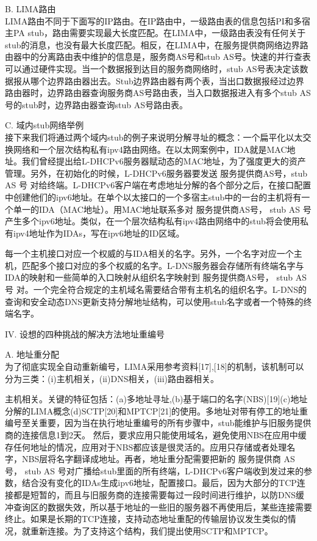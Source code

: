 B.	LIMA路由\\
LIMA路由不同于下面写的IP路由。在IP路由中，一级路由表的信息包括PI和多宿主PA stub，路由需要实现最大长度匹配。在LIMA中，一级路由表没有任何关于stub的消息，也没有最大长度匹配。相反，在LIMA中，在服务提供商网络边界路由器中的分离路由表中维护的信息是，服务商AS号和stub AS号。快速的并行查表可以通过硬件实现。当一个数据报到达目的服务商网络时，stub AS号表决定该数据报从哪个边界路由器出去。Stub边界路由器有两个表，当出口数据报经过边界路由器时，边界路由器查询服务商AS号路由表，当入口数据报进入有多个stub AS号的stub时，边界路由器查询stub AS号路由表。


C.	域内stub网络举例\\
接下来我们将通过两个域内stub的例子来说明分解寻址的概念：一个扁平化以太交换网络和一个层次结构私有ipv4路由网络。在以太网案例中，IDA就是MAC地址。我们曾经提出给L-DHCPv6服务器赋动态的MAC地址，为了强度更大的资产管理。另外，在初始化的时候，L-DHCPv6服务器要发送 { 服务提供商AS号，stub AS 号 } 对给终端。L-DHCPv6客户端在考虑地址分解的各个部分之后，在接口配置中创建他们的ipv6地址。在单个以太接口的一个多宿主stub中的一台的主机将有一个单一的IDA（MAC地址）。用MAC地址联系多对 { 服务提供商AS号， stub AS 号}产生多个ipv6地址。类似，在一个层次结构私有ipv4路由网络中的stub将会使用私有ipv4地址作为IDAs，写在ipv6地址的ID区域。


每一个主机接口对应一个权威的与IDA相关的名字。另外，一个名字对应一个主机，匹配多个接口对应的多个权威的名字。L-DNS服务器会存储所有终端名字与IDA的映射和一些简单的入口映射从组织名字映射到 { 服务提供商AS号， stub AS 号 }对。一个完全符合规定的主机域名需要结合带有主机名的组织名字。L-DNS的查询和安全动态DNS更新支持分解地址结构，可以使用stub名字或者一个特殊的终端名字。


IV.	设想的四种挑战的解决方法地址重编号


A.	地址重分配 \\

为了彻底实现全自动重新编号，LIMA采用参考资料[17],[18]的机制，该机制可以分为三类：(i)主机相关，(ii)DNS相关，(iii)路由器相关。


主机相关。关键的特征包括：(a)多地址寻址,(b)基于端口的名字(NBS)[19](c)地址分解的LIMA概念(d)SCTP[20]和MPTCP[21]的使用。多地址对带有停工的地址重编号至关重要，因为当在执行地址重编号的所有步骤中，stub能维护与旧服务提供商的连接信息1到2天。 然后，要求应用只能使用域名，避免使用NBS在应用中缓存任何地址的情况，应用对于NBS都应该是很灵活的。应用只存储或者处理名字，NBS层将名字翻译成地址。再者，地址重分配需要把新的 { 服务提供商 AS 号， stub AS 号}对广播给stub里面的所有终端，L-DHCPv6客户端收到发过来的参数，结合没有变化的IDAs生成ipv6地址，配置接口。最后，因为大部分的TCP连接都是短暂的，而且与旧服务商的连接需要每过一段时间进行维护，以防DNS缓冲查询区的数据失效，所以基于地址的一些旧的服务器不再使用后，某些连接需要终止。如果是长期的TCP连接，支持动态地址重配的传输层协议发生类似的情况，就重新连接。为了支持这个结构，我们提出使用SCTP和MPTCP。



